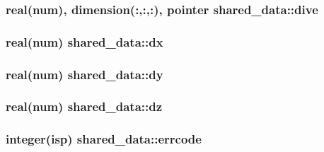\subsubsection[{\texorpdfstring{dive}{dive}}]{\setlength{\rightskip}{0pt plus 5cm}real(num), dimension(\+:,\+:,\+:), pointer shared\+\_\+data\+::dive}\hypertarget{namespaceshared__data_a548e3c8fc335921c106eada05587df31}{}\label{namespaceshared__data_a548e3c8fc335921c106eada05587df31}
\subsubsection[{\texorpdfstring{dx}{dx}}]{\setlength{\rightskip}{0pt plus 5cm}real(num) shared\+\_\+data\+::dx}\hypertarget{namespaceshared__data_a0d718dcaae94920d7faaa4aa47011d5b}{}\label{namespaceshared__data_a0d718dcaae94920d7faaa4aa47011d5b}
\subsubsection[{\texorpdfstring{dy}{dy}}]{\setlength{\rightskip}{0pt plus 5cm}real(num) shared\+\_\+data\+::dy}\hypertarget{namespaceshared__data_a6531be1297bb2ed26fdf8e7336d85e38}{}\label{namespaceshared__data_a6531be1297bb2ed26fdf8e7336d85e38}
\subsubsection[{\texorpdfstring{dz}{dz}}]{\setlength{\rightskip}{0pt plus 5cm}real(num) shared\+\_\+data\+::dz}\hypertarget{namespaceshared__data_a2fb63621d7a6ce9df1700fe5cca75d01}{}\label{namespaceshared__data_a2fb63621d7a6ce9df1700fe5cca75d01}
\subsubsection[{\texorpdfstring{errcode}{errcode}}]{\setlength{\rightskip}{0pt plus 5cm}integer(isp) shared\+\_\+data\+::errcode}\hypertarget{namespaceshared__data_abaa407d5754648a7f9982743e6f66cea}{}\label{namespaceshared__data_abaa407d5754648a7f9982743e6f66cea}
